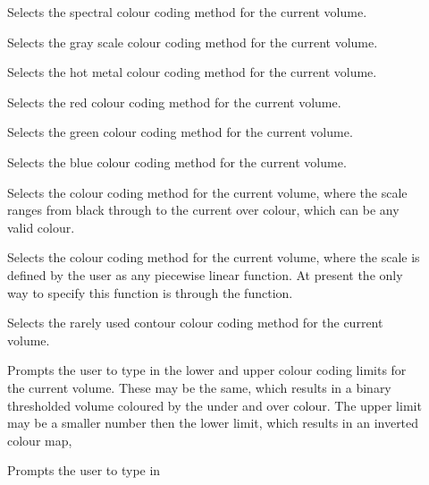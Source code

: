 \begin{description}
\item[]  Selects the spectral colour coding
                                          method for the current volume.
\item[]  Selects the gray scale colour coding
                                          method for the current volume.
\item[]  Selects the hot metal colour coding
                                          method for the current volume.
\item[]  Selects the red colour coding
                                     method for the current volume.
\item[]  Selects the green colour coding
                                       method for the current volume.
\item[]  Selects the blue colour coding
                                      method for the current volume.
\item[]  Selects the
                 colour coding method for the current volume, where the scale
                 ranges from black through to the current over colour, which
                 can be any valid colour.
\item[]  Selects the
                 colour coding method for the current volume, where the scale
                 is defined by the user as any piecewise linear function.
                 At present the only way to specify this function is through
                 the  function.
\item[]  Selects the rarely used contour
                                    colour coding method for the current volume.
\item[]  Prompts the user to type in the lower
                        and upper colour coding limits for the current volume.
                      These may be the same, which results in a binary
                      thresholded volume coloured by the under and over colour.
                      The upper limit may be a smaller number then the lower
                      limit, which results in an inverted colour map,
\item[]  Prompts the user to type in

\end{description}
